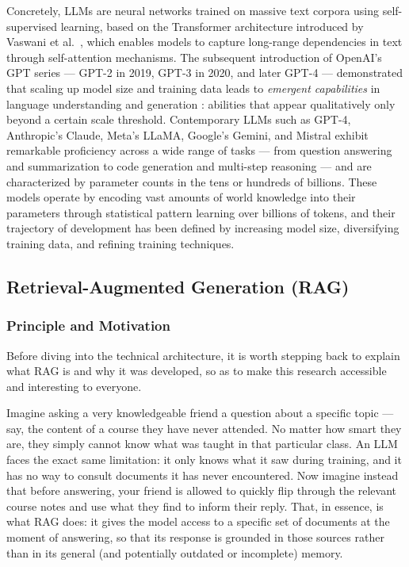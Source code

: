 \documentclass[a4paper,11pt]{article}
\begin{document}
Concretely, LLMs are neural networks trained on massive text corpora using
self-supervised learning, based on the Transformer architecture introduced
by Vaswani et al.\ \cite{vaswani2017attention}, which enables models to
capture long-range dependencies in text through self-attention mechanisms.
The subsequent introduction of OpenAI's GPT series --- GPT-2 in 2019,
GPT-3 in 2020, and later GPT-4 --- demonstrated that scaling up model size
and training data leads to \emph{emergent capabilities} in language
understanding and generation \cite{wei2022emergent}: abilities that appear
qualitatively only beyond a certain scale threshold. Contemporary LLMs such
as GPT-4, Anthropic's Claude, Meta's LLaMA, Google's Gemini, and Mistral
exhibit remarkable proficiency across a wide range of tasks --- from question
answering and summarization to code generation and multi-step reasoning ---
and are characterized by parameter counts in the tens or hundreds of billions.
These models operate by encoding vast amounts of world knowledge into their
parameters through statistical pattern learning over billions of tokens, and
their trajectory of development has been defined by increasing model size,
diversifying training data, and refining training techniques.
\subsection{Retrieval-Augmented Generation (RAG)}
 
\subsubsection{Principle and Motivation}
Before diving into the technical architecture, it is worth stepping back to
explain what RAG is and why it was developed, so as to make this research
accessible and interesting to everyone.
 
Imagine asking a very knowledgeable friend a question about a specific topic
--- say, the content of a course they have never attended. No matter how
smart they are, they simply cannot know what was taught in that particular
class. An LLM faces the exact same limitation: it only knows what it saw
during training, and it has no way to consult documents it has never
encountered. Now imagine instead that before answering, your friend is
allowed to quickly flip through the relevant course notes and use what they
find to inform their reply. That, in essence, is what RAG does: it gives the
model access to a specific set of documents at the moment of answering, so
that its response is grounded in those sources rather than in its general
(and potentially outdated or incomplete) memory.
 
\end{document}
